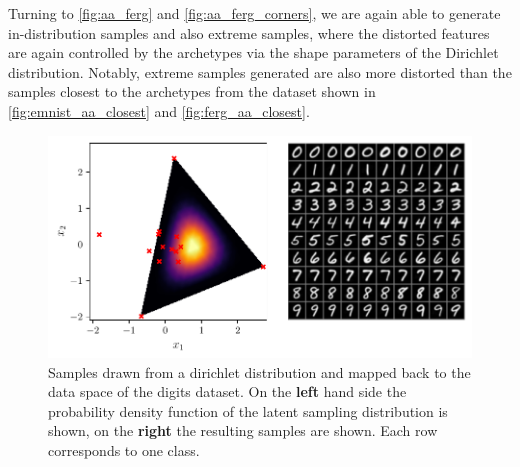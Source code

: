 Turning to \autoref{fig:aa_ferg} and \autoref{fig:aa_ferg_corners}, we
are again able to generate in-distribution samples and also extreme samples,
where the distorted features are again controlled by the archetypes via the
shape parameters of the Dirichlet distribution. Notably, extreme samples
generated are also more distorted than the samples closest to the archetypes
from the dataset shown in \autoref{fig:emnist_aa_closest} and
\autoref{fig:ferg_aa_closest}.

\begin{figure}[htpb]
	\centering
	\includegraphics[width=1\linewidth]{figures/samples/aa_emnist.pdf}
	\caption{Samples drawn from a dirichlet distribution and mapped back to
		the data space of the digits dataset. On the \textbf{left} hand side the
		probability density function of the latent sampling distribution is
		shown, on the \textbf{right} the resulting samples are shown. Each row
		corresponds to one class.}%
	\label{fig:aa_emnist}
\end{figure}

